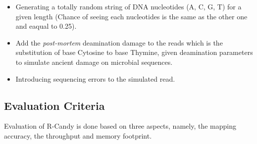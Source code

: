 \documentclass[11pt,a4paper]{report}
\begin{document}
\begin{itemize}

 \item Generating a totally random string of DNA nucleotides (A, C, G, T) for a 
given length (Chance of seeing each nucleotides is the same as the other one and 
eaqual to 0.25).

 \item Add the \emph{post-mortem} deamination damage to the reads which is the 
substitution of base Cytosine to base Thymine, given deamination parameters 
to simulate ancient damage on microbial sequences.


 \item Introducing sequencing errors to the simulated read.

\end{itemize}




\subsection{Evaluation Criteria} \label{Evaluation Criteria}

Evaluation of R-Candy is done based on three aspects, namely, 
the mapping accuracy, the throughput and memory footprint.
\end{document}
